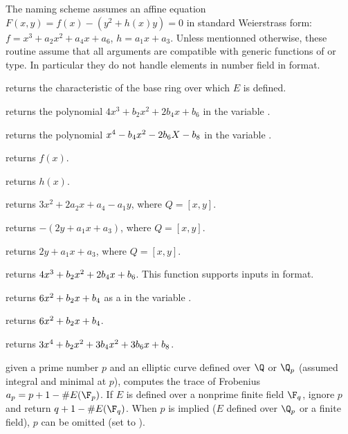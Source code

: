 
The naming scheme assumes an affine equation
$F(x,y) = f(x) - (y^2 + h(x)y) = 0$
in standard Weierstrass form: $f = x^3+a_2x^2+a_4x+a_6$, $h = a_1x + a_3$.
Unless mentionned otherwise, these routine assume that all arguments are
compatible with generic functions of  or  type. In
particular they do not handle elements in number field in 
format.

 returns the characteristic of the base ring over
which $E$ is defined.

 returns the polynomial $4x^3 + b_2x^2 +
2b_4x + b_6$ in the variable .

 returns the polynomial $x^4 - b_4x^2 - 2b_6\*X
- b_8$ in the variable .

 returns $f(x)$.

 returns $h(x)$.

 returns $3x^2 + 2a_2x + a_4 -a_1y$,
where $Q = [x,y]$.

 returns $-(2y + a_1 x + a_3)$,
where $Q = [x,y]$.

 returns $2y + a_1 x + a_3$,
where $Q = [x,y]$.

 returns
$4x^3 + b_2\*x^2 + 2\*b_4x + b_6$. This function supports inputs
in  format.

 returns
$6\*x^2 + b_2\*x + b_4$ as a  in the variable .

 returns
$6\*x^2 + b_2\*x + b_4$.

 returns
$3\*x^4 + b_2\*x^2 + 3\*b_4\*x^2 + 3\*b_6\*x + b_8$.



 given a prime number $p$ and an elliptic curve
defined over $\Q$ or $\Q_p$ (assumed integral and minimal at $p$), computes
the  trace of  Frobenius  $a_p = p+1 - \#E(\F_p)$. If $E$ is defined over
a nonprime finite field $\F_q$, ignore $p$ and return $q+1 - \#E(\F_q)$.
When $p$ is implied ($E$ defined over $\Q_p$ or a finite field), $p$ can be
omitted (set to ).

